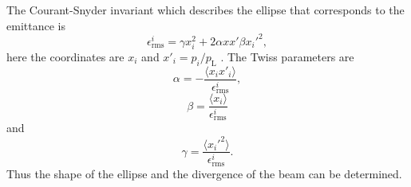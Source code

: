 The Courant-Snyder invariant which describes the ellipse that corresponds to the emittance is
\begin{equation}
	\epsilon^i_\mathrm{rms}  = \gamma x_i^2 + 2\alpha x x' \beta x_i'^2,
\end{equation}
here the coordinates are $x_i$ and $x'_i = p_i/p_\mathrm{L}$ \cite{wiedemann_2015_ParticleAcceleratorPhysics}. The Twiss parameters are
\begin{equation}
	\alpha = - \frac{\langle x_i x'_i \rangle}{	\epsilon^i_\mathrm{rms} },
\end{equation}
\begin{equation}
	\beta = \frac{\langle x_i \rangle}{	\epsilon^i_\mathrm{rms} }
\end{equation}
and
\begin{equation}
	\gamma = \frac{\langle x_i'^2 \rangle}{	\epsilon^i_\mathrm{rms} }.
\end{equation}
Thus the shape of the ellipse and the divergence of the beam can be determined.



